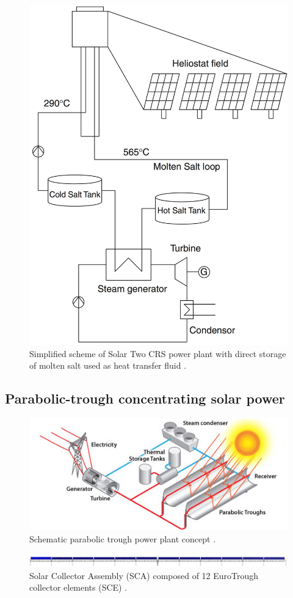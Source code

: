 \begin{figure}[htbp]  
\centering
\includegraphics[width=0.45\linewidth]{FIG/towerdirecttwotank}
\caption[Simplified scheme of Solar Two CRS power plant with direct storage of molten salt used as heat transfer fluid.]{Simplified scheme of Solar Two CRS power plant with direct storage of molten salt used as heat transfer fluid \cite{Richter2013}.}\label{towerdirecttwotank}
\end{figure}

\pagebreak
\subsection{Parabolic-trough concentrating solar power} \label{subsection_PTC}


\begin{figure}[htbp] 
\centering
\includegraphics[width=0.7\linewidth]{FIG/parabolic_troughs}
\caption[Schematic parabolic trough power plant concept.]{Schematic parabolic trough power plant concept \cite{U.S.DOE2013}.}\label{parabolic_troughs}
\end{figure}

\begin{figure}[htbp] 
\centering
\includegraphics[width=1\linewidth]{FIG/SCA_EuroTrough}
\caption[Solar Collector Assembly (SCA) composed of 12 EuroTrough collector elements (SCE).]{Solar Collector Assembly (SCA) composed of 12 EuroTrough collector elements (SCE) \cite{VonReeken2014}.}\label{SCA_EuroTrough}
\end{figure}

